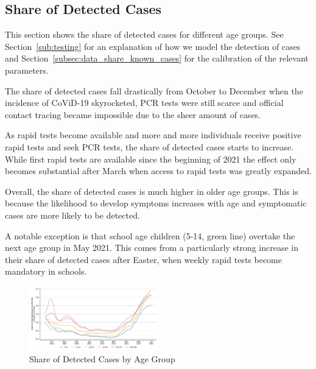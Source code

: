 \subsection{Share of Detected Cases}
\label{subsec:results_share_known_cases}


This section shows the share of detected cases for different age groups. See
Section~\ref{sub:testing} for an explanation of how we model the detection of cases and
Section~\ref{subsec:data_share_known_cases} for the calibration of the relevant
parameters.

The share of detected cases fall drastically from October to December when the incidence
of CoViD-19 skyrocketed, PCR tests were still scarce and official contact tracing became
impossible due to the sheer amount of cases.

As rapid tests become available and more and more individuals receive positive rapid
tests and seek PCR tests, the share of detected cases starts to increase. While first
rapid tests are available since the beginning of 2021 the effect only becomes
substantial after March when access to rapid tests was greatly expanded.

Overall, the share of detected cases is much higher in older age groups. This is because
the likelihood to develop symptoms increases with age and symptomatic cases are more
likely to be detected.


A notable exception is that school age children (5-14, green line) overtake the next age
group in May 2021. This comes from a particularly strong increase in their share of
detected cases after Easter, when weekly rapid tests become mandatory in schools.

\begin{figure}[ht]
    \centering
    \includegraphics[width=0.5\textwidth]{figures/results/figures/share_known_cases/full_combined_baseline_by_age_group_rki}
    \caption{Share of Detected Cases by Age Group}
    \label{fig:share_known_cases_by_age_group}
\end{figure}


\FloatBarrier
